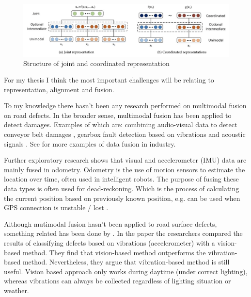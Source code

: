 \begin{figure}[ht]
\begin{center}
\includegraphics[width=\textwidth,keepaspectratio]{images/2_literature/joint-vs-coordinated-representations.png}
\end{center}
\caption{Structure of joint and coordinated representation \cite{Baltrusaitis2017}}
\label{fig:structure-joint-coordinated}
\end{figure}

For my thesis I think the most important challenges will be relating to representation, alignment and fusion.

To my knowledge there hasn't been any research performed on multimodal fusion on road defects. In the broader sense, multimodal fusion has been applied to detect damages. Examples of which are: combining audio-visual data to detect conveyor belt damages \cite{Che2021}, gearbox fault detection based on vibrations and acoustic signals \cite{Li2016}. See \cite{Olivan2018} for more examples of data fusion in industry.

Further exploratory research shows that visual and accelerometer (IMU) data are mainly fused in odometry. Odometry is the use of motion sensors to estimate the location over time, often used in intelligent robots. The purpose of fusing these data types is often used for dead-reckoning. Which is the process of calculating the current position based on previously known position, e.g. can be used when GPS connection is unstable / lost \cite{Jiang2017,Brossard2020}.

Although mutimodal fusion hasn't been applied to road surface defects, something related has been done by . In the paper the researchers compared the results of classifying defects based on vibrations (accelerometer) with a vision-based method. They find that vision-based method outperforms the vibration-based method. Nevertheless, they argue that vibration-based method is still useful. Vision based approach only works during daytime (under correct lighting), whereas vibrations can always be collected regardless of lighting situation or weather.

